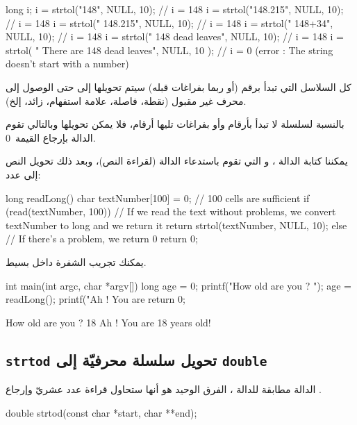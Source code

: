 \begin{Csource}
long i;
i = strtol("148", NULL, 10); // i = 148
i = strtol("148.215", NULL, 10); // i = 148
i = strtol(" 148.215", NULL, 10); // i = 148
i = strtol(" 148+34", NULL, 10); // i = 148
i = strtol(" 148 dead leaves", NULL, 10); // i = 148
i = strtol( " There are 148 dead leaves", NULL, 10 ); // i = 0 (error : The string doesn't start with a number)
\end{Csource}

كل السلاسل التي تبدأ برقم (أو ربما بفراغات قبله) سيتم تحويلها إلى
حتى الوصول إلى محرف غير مقبول (نقطة، فاصلة، علامة استفهام، زائد، إلخ).

بالنسبة لسلسلة لا تبدأ بأرقام وأو بفراغات تليها أرقام، فلا يمكن تحويلها وبالتالي تقوم الدالة بإرجاع القيمة~0.

يمكننا كتابة الدالة
،
و التي تقوم باستدعاء الدالة
(لقراءة النص)، وبعد ذلك تحويل النص إلى عدد:

\begin{Csource}
long readLong()
{
 	char textNumber[100] = {0}; // 100 cells are sufficient
 	if (read(textNumber, 100))
 	{
     		// If we read the text without problems, we convert textNumber to long and we return it
    		 return strtol(textNumber, NULL, 10);
 	}
 	else
 	{
    		 // If there's a problem, we return 0
     		return 0;
	 }
}
\end{Csource}

يمكنك تجريب الشفرة داخل
بسيط.

\begin{Csource}
int main(int argc, char *argv[])
{
 	long age = 0;
 	printf("How old are you ? ");
 	age = readLong();
 	printf("Ah ! You are %
 	return 0;
}
\end{Csource}

\begin{Console}
How old are you ? 18
Ah ! You are 18 years old!
\end{Console}

\subsection{\texttt{strtod} تحويل سلسلة محرفيّة إلى \texttt{double}}

الدالة
مطابقة للدالة
،
الفرق الوحيد هو أنها ستحاول قراءة عدد عشريّ وإرجاع
.

\begin{Csource}
double strtod(const char *start, char **end);
\end{Csource}

